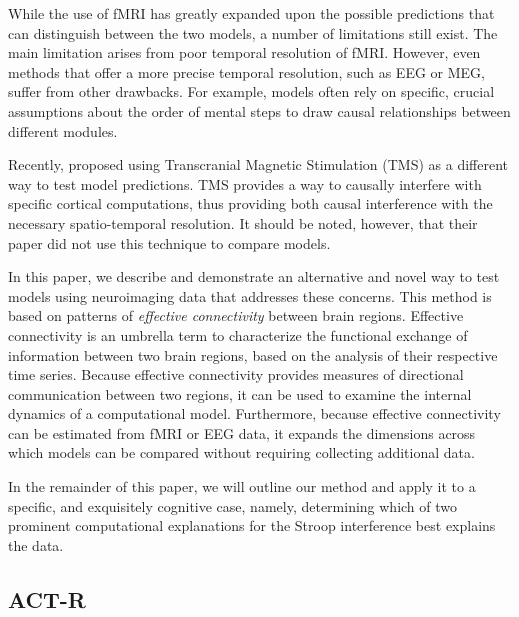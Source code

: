 \documentclass[10pt,letterpaper]{article}
\begin{document}
While the use of fMRI has greatly expanded upon the possible predictions that can distinguish between the two models, a number of limitations still exist. The main limitation arises from poor temporal resolution of fMRI.  However, even methods that offer a more precise temporal resolution, such as EEG or MEG, suffer from other drawbacks. For example, models often rely on specific, crucial assumptions about the order of mental steps to draw causal relationships between different modules.

Recently,  proposed using Transcranial Magnetic Stimulation (TMS) as a different way to test model predictions. TMS provides a way to causally interfere with specific cortical computations, thus providing both causal interference with the necessary spatio-temporal resolution. It should be noted, however, that their paper did not use this technique to compare models. 

In this paper, we describe and demonstrate an alternative and novel way to test models using neuroimaging data that addresses these concerns. This method is based on patterns of {\it effective connectivity} between brain regions. Effective connectivity is an umbrella term to characterize the functional exchange of information between two brain regions, based on the analysis of their respective time series. Because effective connectivity provides measures of directional communication between two regions, it can be used to examine the internal dynamics of a computational model.  Furthermore, because effective connectivity can be estimated from fMRI or EEG data, it expands the dimensions across which models can be compared without requiring collecting additional data.

In the remainder of this paper, we will outline our method and apply it to a specific, and exquisitely cognitive case, namely, determining which of two prominent computational explanations for the Stroop interference best explains the data.    

\subsection{ACT-R}
\end{document}
